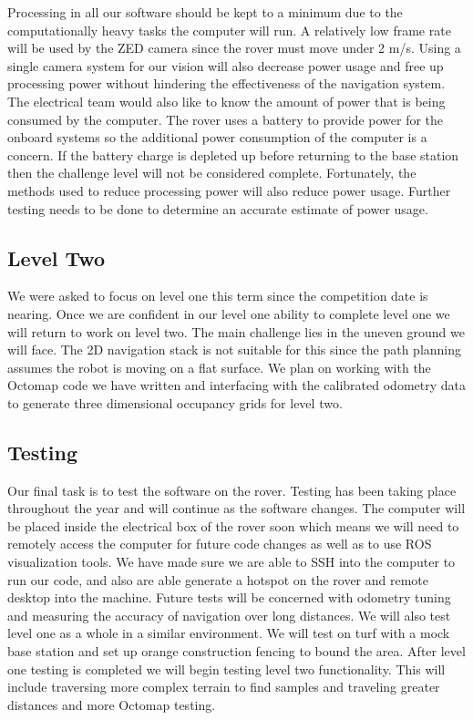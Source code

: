 \documentclass[10pt, oneside,onecolumn]{IEEEtran}
\begin{document}
Processing in all our software should be kept to a minimum due to the computationally heavy tasks the computer will run. A relatively low frame rate will be used by the ZED camera since the rover must move under 2 m/s. Using a single camera system for our vision will also decrease power usage and free up processing power without hindering the effectiveness of the navigation system. The electrical team would also like to know the amount of power that is being consumed by the computer. The rover uses a battery to provide power for the onboard systems so the additional power consumption of the computer is a concern. If the battery charge is depleted up before returning to the base station then the challenge level will not be considered complete. Fortunately, the methods used to reduce processing power will also reduce power usage. Further testing needs to be done to determine an accurate estimate of power usage.

\subsection{Level Two} We were asked to focus on level one this term since the competition date is nearing. Once we are confident in our level one ability to complete level one we will return to work on level two. The main challenge lies in the uneven ground we will face. The 2D navigation stack is not suitable for this since the path planning assumes the robot is moving on a flat surface. We plan on working with the Octomap code we have written and interfacing with the calibrated odometry data to generate three dimensional occupancy grids for level two. 

\subsection{Testing}
Our final task is to test the software on the rover. Testing has been taking place throughout the year and will continue as the software changes. The computer will be placed inside the electrical box of the rover soon which means we will need to remotely access the computer for future code changes as well as to use ROS visualization tools. We have made sure we are able to SSH into the computer to run our code, and also are able generate a hotspot on the rover and remote desktop into the machine. Future tests will be concerned with odometry tuning and measuring the accuracy of navigation over long distances. We will also test level one as a whole in a similar environment. We will test on turf with a mock base station and set up orange construction fencing to bound the area. After level one testing is completed we will begin testing level two functionality. This will include traversing more complex terrain to find samples and traveling greater distances and more Octomap testing. 
\end{document}
